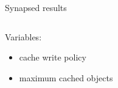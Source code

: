 \begin{frame}{Synapsed results}
\begin{columns}[t]
\begin{column}{.5\textwidth}
{			}
			Variables:
			\begin{itemize}
				\item cache write policy
				\item maximum cached objects
			\end{itemize}
		\end{column}
	\end{columns}
\end{frame}

